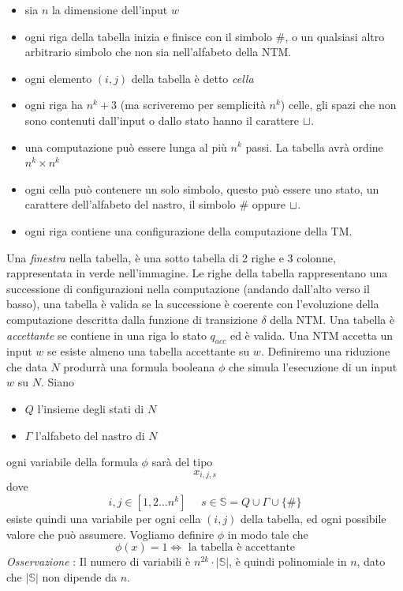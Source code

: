 \documentclass[10pt, letterpaper]{report}
\begin{document}
\begin{itemize}
    \item sia $n$ la dimensione dell'input $w$
    \item ogni riga della tabella inizia e finisce con il simbolo $\#$, o un qualsiasi altro arbitrario simbolo che non sia nell'alfabeto della NTM. 
    \item ogni elemento $(i,j)$ della tabella è detto \textit{cella}
    \item ogni riga ha $n^k+3$ (ma scriveremo per semplicità $n^k$) celle, gli spazi che non sono contenuti dall'input o dallo stato hanno il carattere ${\sqcup}$.\item una computazione può essere lunga al più $n^k$ passi. La tabella avrà ordine $n^k\times n^k$
    \item ogni cella può contenere un solo simbolo, questo può essere uno stato, un carattere dell'alfabeto del nastro, il simbolo $\#$ oppure ${\sqcup}$.
    \item ogni riga contiene una configurazione della computazione della TM.
\end{itemize}
Una \textit{finestra} nella tabella, è una sotto tabella di 2 righe e 3 colonne, rappresentata in verde nell'immagine.\acc 
Le righe della tabella rappresentano una successione di configurazioni nella computazione (andando dall'alto verso il basso), una tabella è valida se la successione è coerente con l'evoluzione della computazione descritta dalla funzione di transizione $\delta$ della NTM.\acc 
Una tabella è \textit{accettante} se contiene in una riga lo stato $q_{acc}$ ed è valida. Una NTM accetta un input $w$ se esiste almeno una tabella accettante su $w$.\acc 
Definiremo una riduzione che data $N$ produrrà una formula booleana $\phi$ che simula l'esecuzione di un input $w$ su $N$. Siano \begin{itemize}
    \item $Q$ l'insieme degli stati di $N$
    \item $\Gamma$ l'alfabeto del nastro di $N$
\end{itemize}
ogni variabile della formula $\phi$ sarà del tipo 
$$ x_{i,j,s}$$
dove 
$$ i,j \in [1,2\dots n^k] \ \ \ \ \ \ s\in\mathbb S = Q\cup \Gamma \cup \{\#\}$$
esiste quindi una variabile per ogni cella $(i,j)$ della tabella, ed ogni possibile valore che può assumere. Vogliamo definire $\phi$ in modo tale che $$ \phi(x)=1\iff \text{ la tabella è accettante}$$
\textit{Osservazione} : Il numero di variabili è $n^{2k}\cdot |\mathbb{S}|$, è quindi polinomiale in $n$, dato che $|\mathbb{S}|$ non dipende da $n$.\acc 
\end{document}
